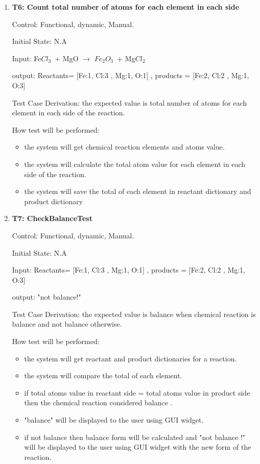 \documentclass[12pt, titlepage]{article}
\begin{document}
\begin{enumerate}

\item{\bf T6: Count total number of atoms for each element in each side\\}

Control: Functional, dynamic, Manual.
					
Initial State: N.A
					
Input: Fe$Cl_3$ + MgO $\rightarrow$ $Fe_2$$O_3$ + Mg$Cl_2$ 

output: Reactants= [Fe:1, Cl:3 , Mg:1, O:1] , products = [Fe:2, Cl:2 , Mg:1, O:3] 
 
Test Case Derivation: the expected value is total number of atoms for each element in each side of the reaction. 

How test will be performed: 
\begin{itemize}
\item the system will get chemical reaction elements and atoms value. 
\item the system will calculate the total atom value for each element in each side of the reaction. 
\item the system will save the total of each element in reactant dictionary and product dictionary
\end{itemize}


\item{\bf T7: CheckBalanceTest\\}

Control: Functional, dynamic, Manual.
					
Initial State: N.A
					
Input: Reactants= [Fe:1, Cl:3 , Mg:1, O:1] , products = [Fe:2, Cl:2 , Mg:1, O:3] 

output: "not balance!"

Test Case Derivation: the expected value is balance when chemical reaction is balance and not balance otherwise. 

How test will be performed: 
\begin{itemize}
\item the system will get reactant  and product dictionaries for a reaction. 
\item the system will compare the total of each element.
\item if total atoms value in reactant side = total atoms value in product side then the chemical reaction considered balance .
\item "balance" will be displayed to the user using GUI widget. 
\item if not balance then balance form will be calculated and "not balance !" will be displayed to the user using GUI widget with the new form of the reaction.
\end{itemize}


\end{enumerate}
\end{document}

